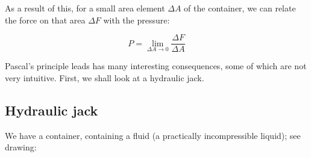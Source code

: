 As a result of this, for a small area element $\Delta A$ of the container, we can relate the force on that area $\Delta F$ with the pressure:

\begin{equation}
P = \lim_{\Delta A \to 0} \frac{\Delta F}{\Delta A}
\end{equation}

Pascal's principle leads has many interesting consequences, some of which are not very intuitive. First, we shall look at a hydraulic jack.

\subsection{Hydraulic jack}

We have a container, containing a fluid (a practically incompressible liquid); see drawing:

